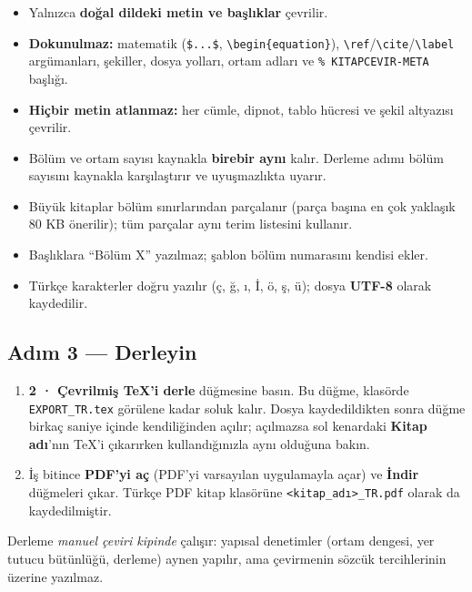 \documentclass[11pt,a4paper]{article}
\newcommand{\dugme}[1]{\textsf{\bfseries #1}}
\newcommand{\dosya}[1]{\texttt{#1}}
\begin{document}
\begin{itemize}
  \item Yalnızca \textbf{doğal dildeki metin ve başlıklar} çevrilir.
  \item \textbf{Dokunulmaz:} matematik (\dosya{\$...\$},
        \dosya{\textbackslash begin\{equation\}}),
        \dosya{\textbackslash ref}/\dosya{\textbackslash cite}/\dosya{\textbackslash label}
        argümanları, şekiller, dosya yolları, ortam adları ve
        \dosya{\% KITAPCEVIR-META} başlığı.
  \item \textbf{Hiçbir metin atlanmaz:} her cümle, dipnot, tablo hücresi ve
        şekil altyazısı çevrilir.
  \item Bölüm ve ortam sayısı kaynakla \textbf{birebir aynı} kalır. Derleme
        adımı bölüm sayısını kaynakla karşılaştırır ve uyuşmazlıkta uyarır.
  \item Büyük kitaplar bölüm sınırlarından parçalanır (parça başına en çok
        yaklaşık 80 KB önerilir); tüm parçalar aynı terim listesini kullanır.
  \item Başlıklara ``Bölüm X'' yazılmaz; şablon bölüm numarasını kendisi ekler.
  \item Türkçe karakterler doğru yazılır (ç, ğ, ı, İ, ö, ş, ü); dosya
        \textbf{UTF-8} olarak kaydedilir.
\end{itemize}

\subsection{Adım 3 --- Derleyin}
\begin{enumerate}
  \item \dugme{2 · Çevrilmiş TeX'i derle} düğmesine basın. Bu düğme, klasörde
        \dosya{EXPORT\_TR.tex} görülene kadar soluk kalır. Dosya
        kaydedildikten sonra düğme birkaç saniye içinde kendiliğinden açılır;
        açılmazsa sol kenardaki \dugme{Kitap adı}'nın TeX'i çıkarırken
        kullandığınızla aynı olduğuna bakın.
  \item İş bitince \dugme{PDF'yi aç} (PDF'yi varsayılan uygulamayla açar) ve
        \dugme{İndir} düğmeleri çıkar. Türkçe PDF kitap klasörüne
        \dosya{<kitap\_adı>\_TR.pdf} olarak da kaydedilmiştir.
\end{enumerate}

Derleme \emph{manuel çeviri kipinde} çalışır: yapısal denetimler (ortam
dengesi, yer tutucu bütünlüğü, derleme) aynen yapılır, ama çevirmenin sözcük
tercihlerinin üzerine yazılmaz.
\end{document}
